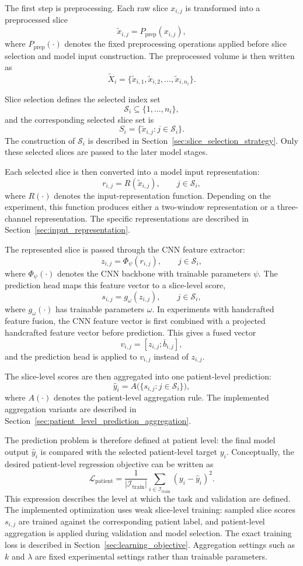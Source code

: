 The first step is preprocessing. Each raw slice \(x_{i,j}\) is transformed into a preprocessed slice
\[
\tilde{x}_{i,j} = P_{\mathrm{prep}}(x_{i,j}),
\]
where \(P_{\mathrm{prep}}(\cdot)\) denotes the fixed preprocessing operations applied before slice selection and model input construction. The preprocessed volume is then written as
\[
\tilde{X}_i
=
\{\tilde{x}_{i,1}, \tilde{x}_{i,2}, \dots, \tilde{x}_{i,n_i}\}.
\]

Slice selection defines the selected index set
\[
\mathcal{S}_i \subseteq \{1,\dots,n_i\},
\]
and the corresponding selected slice set is
\[
S_i
=
\{\tilde{x}_{i,j} : j \in \mathcal{S}_i\}.
\]
The construction of \(\mathcal{S}_i\) is described in Section~\ref{sec:slice_selection_strategy}. Only these selected slices are passed to the later model stages.

Each selected slice is then converted into a model input representation:
\[
r_{i,j} = R(\tilde{x}_{i,j}),
\qquad j \in \mathcal{S}_i,
\]
where \(R(\cdot)\) denotes the input-representation function. Depending on the experiment, this function produces either a two-window representation or a three-channel representation. The specific representations are described in Section~\ref{sec:input_representation}.

The represented slice is passed through the CNN feature extractor:
\[
z_{i,j} = \Phi_{\psi}(r_{i,j}),
\qquad j \in \mathcal{S}_i,
\]
where \(\Phi_{\psi}(\cdot)\) denotes the CNN backbone with trainable parameters \(\psi\). The prediction head maps this feature vector to a slice-level score,
\[
s_{i,j} = g_{\omega}(z_{i,j}),
\qquad j \in \mathcal{S}_i,
\]
where \(g_{\omega}(\cdot)\) has trainable parameters \(\omega\). In experiments with handcrafted feature fusion, the CNN feature vector is first combined with a projected handcrafted feature vector before prediction. This gives a fused vector
\[
v_{i,j} = [z_{i,j}; \bar{b}_{i,j}],
\]
and the prediction head is applied to \(v_{i,j}\) instead of \(z_{i,j}\).

The slice-level scores are then aggregated into one patient-level prediction:
\[
\hat{y}_i =
A\bigl(\{s_{i,j} : j \in \mathcal{S}_i\}\bigr),
\]
where \(A(\cdot)\) denotes the patient-level aggregation rule. The implemented aggregation variants are described in Section~\ref{sec:patient_level_prediction_aggregation}.

The prediction problem is therefore defined at patient level: the final model output \(\hat{y}_i\) is compared with the selected patient-level target \(y_i\). Conceptually, the desired patient-level regression objective can be written as
\[
\mathcal{L}_{\mathrm{patient}}
=
\frac{1}{|\mathcal{I}_{\mathrm{train}}|}
\sum_{i \in \mathcal{I}_{\mathrm{train}}}
\left(y_i - \hat{y}_i\right)^2.
\]
This expression describes the level at which the task and validation are defined. The implemented optimization uses weak slice-level training: sampled slice scores \(s_{i,j}\) are trained against the corresponding patient label, and patient-level aggregation is applied during validation and model selection. The exact training loss is described in Section~\ref{sec:learning_objective}. Aggregation settings such as \(k\) and \(\lambda\) are fixed experimental settings rather than trainable parameters.



